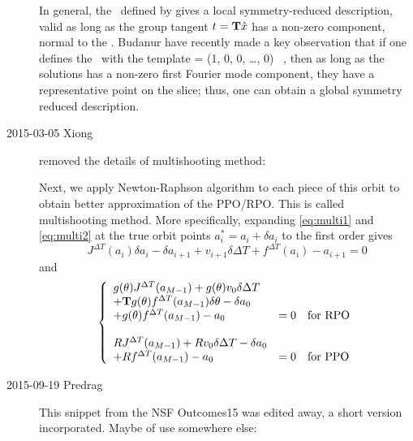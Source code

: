 \begin{description}
In general, the \slicePlane\ defined by  gives a local
symmetry-reduced description, valid as long as the group tangent $t
= \mathbf{T} \hat{x}$ has a non-zero component, normal to the \slicePlane .
Budanur \etal{} have recently made a key observation that if
one defines the \slicePlane\ with the template
\beq
    \slicep = (1, 0, 0, \ldots , 0) \, ,
    \label{e-slicep}
\eeq
then as long as the solutions has a non-zero first Fourier mode component,
they have a representative point on the slice; thus, one can obtain a global
symmetry reduced description.

\item[2015-03-05 Xiong] removed the details of multishooting method:

Next, we apply Newton-Raphson algorithm to each piece
of this orbit to obtain better approximation of the PPO/RPO. This is called
multishooting method. More specifically, expanding \eqref{eq:multi1} and
\eqref{eq:multi2} at the true orbit points $a^*_i = a_i + \delta a_i$
to the first order gives
\[
J^{\Delta T}(a_i) \delta a_i - \delta a_{i+1} + v_{i+1}\delta \Delta T +
f^{\Delta T}(a_i) - a_{i+1} = 0
\]
and
\begin{equation}
\left\{
  \begin{array}{l l}
    g(\theta)J^{\Delta T}(a_{M-1}) + g(\theta)v_{0}\delta \Delta T \\
    +\mathbf{T}g(\theta)f^{\Delta T}(a_{M-1})\delta \theta - \delta a_0 \\
    + g(\theta)f^{\Delta T}(a_{M-1}) - a_0 & = 0 \quad \text{for RPO} \\
    \\
    RJ^{\Delta T}(a_{M-1}) + Rv_{0}\delta \Delta T - \delta a_0  \\
    + Rf^{\Delta T}(a_{M-1}) - a_0
    & = 0 \quad \text{for PPO}
  \end{array}
\right.
\label{eq:multi2}
\end{equation}

\item[2015-09-19 Predrag] This snippet from the NSF Outcomes15 was edited
away, a short version incorporated. Maybe of use somewhere else:


\end{description}
